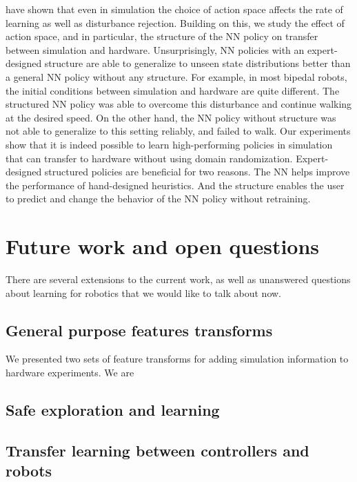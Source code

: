 \cite{peng2017learning} have shown that even in simulation the choice of action space affects the rate of learning as well as disturbance rejection. Building on this, we study the effect of action space, and in particular, the structure of the NN policy on transfer between simulation and hardware. Unsurprisingly, NN policies with an expert-designed structure are able to generalize to unseen state distributions better than a general NN policy without any structure. For example, in most bipedal robots, the initial conditions between simulation and hardware are quite different. The structured NN policy was able to overcome this disturbance and continue walking at the desired speed. On the other hand, the NN policy without structure was not able to generalize to this setting reliably, and failed to walk. Our experiments show that it is indeed possible to learn high-performing policies in simulation that can transfer to hardware without using domain randomization. Expert-designed structured policies are beneficial for two reasons. The NN helps improve the performance of hand-designed heuristics. And the structure enables the user to predict and change the behavior of the NN policy without retraining. 

\section{Future work and open questions}

There are several extensions to the current work, as well as unanswered questions about learning for robotics that we would like to talk about now.

\subsection{General purpose features transforms}

We presented two sets of feature transforms for adding simulation information to hardware experiments. We are 

\subsection{Safe exploration and learning}

\subsection{Transfer learning between controllers and robots}
